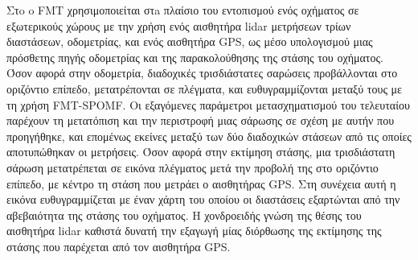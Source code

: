Στo \cite{Rohde2016} o FMT χρησιμοποιείται στa πλαίσιο του εντοπισμού ενός
οχήματος σε εξωτερικούς χώρους με την χρήση ενός αισθητήρα lidar μετρήσεων
τρίων διαστάσεων, οδομετρίας, και ενός αισθητήρα GPS, ως μέσο υπολογισμού μιας
πρόσθετης πηγής οδομετρίας και της παρακολούθησης της στάσης του οχήματος. Όσον
αφορά στην οδομετρία, διαδοχικές τρισδιάστατες σαρώσεις προβάλλονται στο
οριζόντιο επίπεδο, μετατρέπονται σε πλέγματα, και ευθυγραμμίζονται μεταξύ τους
με τη χρήση FMT-SPOMF. Οι εξαγόμενες παράμετροι μετασχηματισμού του τελευταίου
παρέχουν τη μετατόπιση και την περιστροφή μιας σάρωσης σε σχέση με αυτήν που
προηγήθηκε, και επομένως εκείνες μεταξύ των δύο διαδοχικών στάσεων από τις
οποίες αποτυπώθηκαν οι μετρήσεις. Όσον αφορά στην εκτίμηση στάσης, μια
τρισδιάστατη σάρωση μετατρέπεται σε εικόνα πλέγματος μετά την προβολή της στο
οριζόντιο επίπεδο, με κέντρο τη στάση που μετράει ο αισθητήρας GPS. Στη
συνέχεια αυτή η εικόνα ευθυγραμμίζεται με έναν χάρτη του οποίου οι διαστάσεις
εξαρτώνται από την αβεβαιότητα της στάσης του οχήματος. Η χονδροειδής γνώση της
θέσης του αισθητήρα lidar καθιστά δυνατή την εξαγωγή μίας διόρθωσης της
εκτίμησης της στάσης που παρέχεται από τον αισθητήρα GPS.
